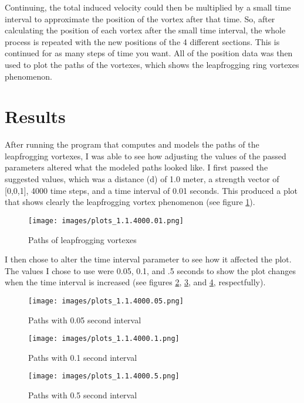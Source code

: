 \documentclass{article}
\begin{document}
Continuing, the total induced velocity could then be multiplied by a small time interval to approximate the position of the vortex after that time. So, after calculating the position of each vortex after the small time interval, the whole process is repeated with the new positions of the 4 different sections. This is continued for as many steps of time you want. All of the position data was then used to plot the paths of the vortexes, which shows the leapfrogging ring vortexes phenomenon.

\section{Results}
After running the program that computes and models the paths of the leapfrogging vortexes, I was able to see how adjusting the values of the passed parameters altered what the modeled paths looked like. I first passed the suggested values, which was a distance (d) of 1.0 meter, a strength vector of [0,0,1], 4000 time steps, and a time interval of 0.01 seconds. This produced a plot that shows clearly the leapfrogging vortex phenomenon (see figure \ref{fig:paths_01_time}).

\begin{figure}[ht]
\centering
\texttt{[image: images/plots\_1.1.4000.01.png]}
\caption{Paths of leapfrogging vortexes}
\label{fig:paths_01_time}
\end{figure}

I then chose to alter the time interval parameter to see how it affected the plot. The values I chose to use were 0.05, 0.1, and .5 seconds to show the plot changes when the time interval is increased (see figures \ref{fig:paths_05_time}, \ref{fig:paths_1_time}, and \ref{fig:paths_5_time}, respectfully).

\begin{figure}[ht]
\centering
\texttt{[image: images/plots\_1.1.4000.05.png]}
\caption{Paths with 0.05 second interval}
\label{fig:paths_05_time}
\end{figure}

\begin{figure}[ht]
\centering
\texttt{[image: images/plots\_1.1.4000.1.png]}
\caption{Paths with 0.1 second interval}
\label{fig:paths_1_time}
\end{figure}

\begin{figure}[ht]
\centering
\texttt{[image: images/plots\_1.1.4000.5.png]}
\caption{Paths with 0.5 second interval}
\label{fig:paths_5_time}
\end{figure}
\end{document}
